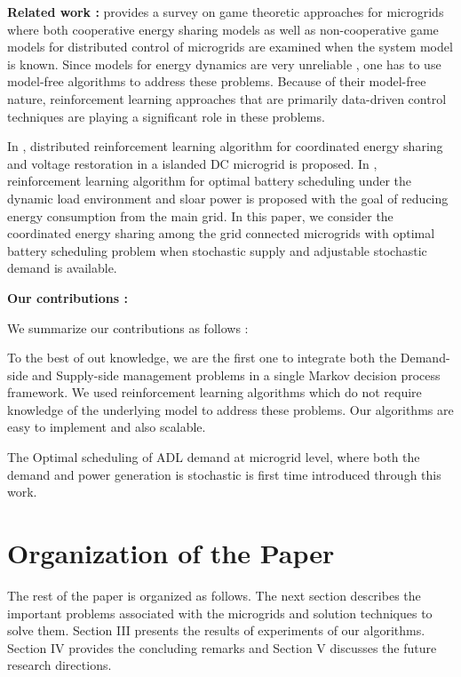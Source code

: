 \textbf{Related work :} \cite{saad2012game} provides a survey on game theoretic approaches for microgrids where both cooperative energy sharing models as well as non-cooperative game models for distributed control of microgrids are examined when the system model is known. Since  models for energy dynamics are very unreliable \cite{zamora2010controls}, one has to use model-free algorithms to address these problems.  Because of their model-free nature, reinforcement learning \cite{sutton1998reinforcement} approaches that are primarily data-driven control techniques are playing a significant role in these problems.

In \cite{zifadistributed}, distributed reinforcement learning algorithm for coordinated energy sharing and voltage restoration in a islanded DC microgrid is proposed. In \cite{leo2014reinforcement}, reinforcement learning algorithm for optimal battery scheduling under the dynamic load environment and sloar power is proposed with the goal of  reducing  energy consumption from the main grid. In this paper, we  consider the coordinated energy sharing among the grid connected microgrids with optimal battery scheduling problem when stochastic supply and adjustable stochastic demand is available.

\textbf{Our contributions :}
\begin{inparaenum}[\bfseries (i)]
We summarize our contributions as follows :\\
\item To the best of out knowledge, we are the first one to integrate both the Demand-side and Supply-side management problems  in a single Markov decision process framework. We used reinforcement learning algorithms which do not require knowledge of the underlying model to address these problems. Our algorithms are easy to implement and also scalable.\\
\item The Optimal scheduling of ADL demand at microgrid level, where both the demand and power generation is stochastic is first time introduced through this work. \\    
\end{inparaenum}
\section*{Organization of the Paper}	
The rest of the paper is organized as follows. The next section describes the important problems associated with the microgrids and solution techniques to solve them. Section III presents the results of experiments of our algorithms. Section IV provides the concluding remarks and Section V discusses the future research directions.